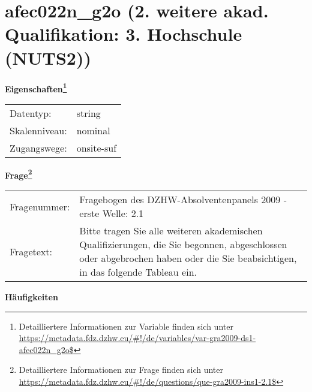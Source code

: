 
    \setcounter{footnote}{0}

    \vspace*{-1.8cm}
	\section{afec022n\_g2o (2. weitere akad. Qualifikation: 3. Hochschule (NUTS2))}
	\label{section:afec022n_g2o}



    \vspace*{0.5cm}
    \noindent\textbf{Eigenschaften\footnote{Detailliertere Informationen zur Variable finden sich unter
		\url{https://metadata.fdz.dzhw.eu/\#!/de/variables/var-gra2009-ds1-afec022n_g2o$}}}\\
	\begin{tabularx}{\hsize}{@{}lX}
	Datentyp: & string \\
	Skalenniveau: & nominal \\
	Zugangswege: &
	  onsite-suf
 \\
    \end{tabularx}



				\vspace*{0.5cm}
                \noindent\textbf{Frage\footnote{Detailliertere Informationen zur Frage finden sich unter
		              \url{https://metadata.fdz.dzhw.eu/\#!/de/questions/que-gra2009-ins1-2.1$}}}\\
				\begin{tabularx}{\hsize}{@{}lX}
					Fragenummer: &
					  Fragebogen des DZHW-Absolventenpanels 2009 - erste Welle:
					  2.1
 \\
					Fragetext: & Bitte tragen Sie alle weiteren akademischen Qualifizierungen, die Sie begonnen, abgeschlossen oder abgebrochen haben oder die Sie beabsichtigen, in das folgende Tableau ein. \\
				\end{tabularx}





        		\vspace*{0.5cm}
                \noindent\textbf{Häufigkeiten}


